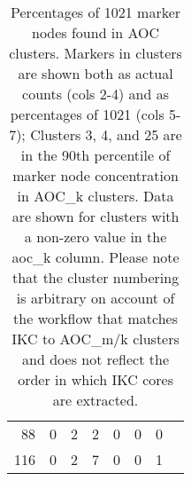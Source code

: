 \documentclass[12pt, oneside]{article}   	%
\begin{document}
\begin{table}[ht]
\begin{tabular}{rrrrrrrr}
88 & 0 &   2 &   2 &   0 &   0 &   0 \\ 
116 & 0 &  2 &   7 &   0 &   0 &   1 \\ 
   \hline
\end{tabular}
\caption{Percentages of 1021 marker nodes found in AOC clusters. Markers in clusters are shown both as actual counts (cols 2-4) and as percentages of 1021 (cols 5-7); Clusters 3, 4, and 25 are in the 90th percentile of marker node concentration in AOC\_k clusters. Data are shown for clusters with a non-zero value in the aoc\_k column. Please note that the cluster numbering is arbitrary on account of the workflow that matches IKC to AOC\_m/k clusters and does not reflect the order in which IKC cores are extracted. }
\end{table}





\end{document}

